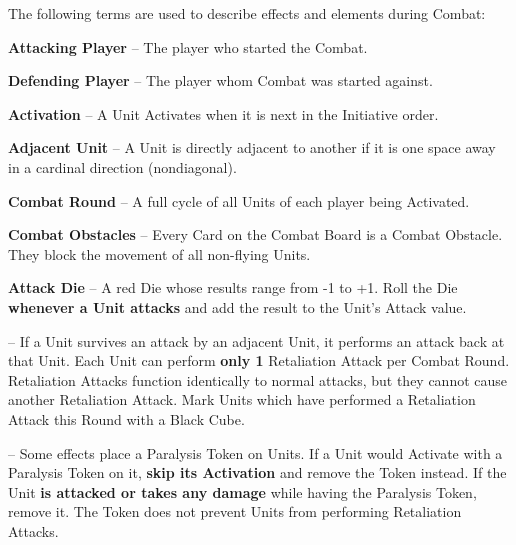 \begin{multicols*}{2}
The following terms are used to describe effects and elements during Combat:\par
\textbf{Attacking Player} – The player who started the Combat.\par
\textbf{Defending Player} – The player whom Combat was started against.\par
\textbf{Activation} – A Unit Activates when it is next in the Initiative order.\par
\textbf{Adjacent Unit} – A Unit is directly adjacent to another if it is one space away in a cardinal direction (nondiagonal).\par
\textbf{Combat Round} – A full cycle of all Units of each player being Activated.\par
\textbf{Combat Obstacles} – Every Card on the Combat Board is a Combat Obstacle.
They block the movement of all non-flying Units.\smallskip\par
{}\parbox{0.7\hsize}{\textbf{Attack Die} – A red Die whose results range from -1 to +1.
Roll the Die \textbf{whenever a Unit attacks} and
add the result to the Unit's Attack value.}\par\smallskip
\textbf{} – If a Unit survives an attack by an adjacent Unit, it performs an attack back at that Unit.
Each Unit can perform \textbf{only 1} Retaliation Attack per Combat Round.
Retaliation Attacks function identically to normal attacks, but they cannot cause another Retaliation Attack.
Mark Units which have performed a Retaliation Attack this Round with a Black Cube.\par
\textbf{}  – Some effects place a Paralysis Token on Units.
If a Unit would Activate with a Paralysis Token on it, \textbf{skip its Activation} and remove the Token instead.
If the Unit \textbf{is attacked or takes any damage} while having the Paralysis Token, remove it.
The Token does not prevent Units from performing Retaliation Attacks.\par

\end{multicols*}
